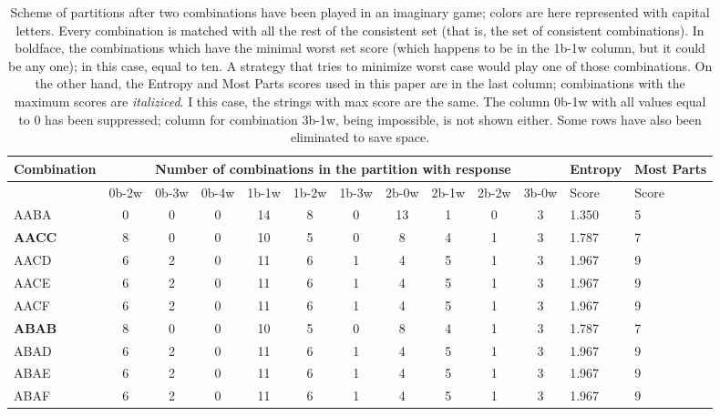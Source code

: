 \documentclass[conference]{IEEEtran}
\begin{document}
\begin{table}[bht]
\caption{Scheme of partitions after two combinations have been played
  in an imaginary game; colors are here represented with capital letters.  Every combination is matched with all
  the rest of the consistent set (that is, the set of consistent combinations).
In boldface, the combinations which have the minimal worst set score (which 
happens to be in the 1b-1w column, 
but it could be any one); in this case, equal to ten. A strategy that
tries to minimize worst case would play one of those combinations. On
the other hand, the Entropy and Most Parts scores used in this paper are in the last
column; combinations with the maximum scores are {\em
  italiziced}. I this case, the strings with max score are the same.
The column 0b-1w with all values equal to 0 has been suppressed;
column for combination 3b-1w, being impossible, is not shown
either. Some rows have also been eliminated to save space.  \label{tab:partitions}}
\small
\centering
\begin{tabular}{|l|c|c|c|c|c|c|c|c|c|c|l|l|}
\hline
Combination & \multicolumn{10}{|c|}{Number of combinations in the
  partition with response} & Entropy & Most Parts \\
\hline
 &0b-2w& 0b-3w& 0b-4w& 1b-1w& 1b-2w& 1b-3w& 2b-0w& 2b-1w& 2b-2w& 3b-0w
 & Score & Score \\
AABA &0 &0 &0 &14 &8 &0 &13 &1 &0 &3  & 1.350 & 5 \\
{\bf AACC} &8 &0 &0 &10 &5 &0 &8 &4 &1 &3  & 1.787 & 7 \\
AACD &6 &2 &0 &11 &6 &1 &4 &5 &1 &3  & 1.967 & 9 \\
AACE &6 &2 &0 &11 &6 &1 &4 &5 &1 &3  & 1.967 & 9 \\
AACF &6 &2 &0 &11 &6 &1 &4 &5 &1 &3  & 1.967 & 9 \\
{\bf ABAB} &8 &0 &0 &10 &5 &0 &8 &4 &1 &3  & 1.787 & 7 \\
ABAD &6 &2 &0 &11 &6 &1 &4 &5 &1 &3  & 1.967 & 9 \\
ABAE &6 &2 &0 &11 &6 &1 &4 &5 &1 &3  & 1.967 & 9 \\
ABAF &6 &2 &0 &11 &6 &1 &4 &5 &1 &3  & 1.967 & 9 \\

\end{tabular}
\end{table}
\end{document}
